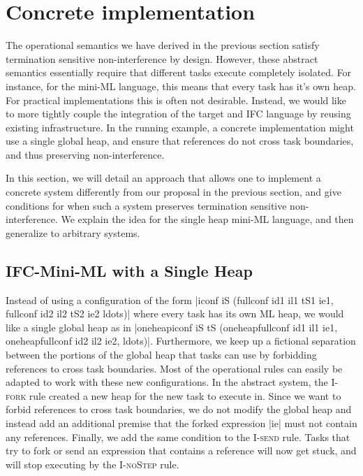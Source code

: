 \section{Concrete implementation}
\label{sec:concrete}


The operational semantics we have derived in the previous section
satisfy termination sensitive non-interference by design.  However,
these abstract semantics essentially require that different tasks
execute completely isolated.  For instance, for the mini-ML language,
this means that every task has it's own heap.  For practical
implementations this is often not desirable.  Instead, we would like to
more tightly couple the integration of the target and IFC
language by reusing existing infrastructure.  In the running example,
a concrete implementation might use a single global heap, and ensure
that references do not cross task boundaries, and thus preserving
non-interference.

In this section, we will detail an approach that allows one to implement
a concrete system differently from our proposal in the previous
section, and give conditions for when such a system preserves termination
sensitive non-interference.
We explain the idea for the single heap mini-ML language, and then
generalize to arbitrary systems.

\subsection{IFC-Mini-ML with a Single Heap}

Instead of using a configuration of the form
|iconf iS (fullconf id1 il1 tS1 ie1, fullconf id2 il2 tS2 ie2 ldots)|
where every task has its
own ML heap, we would like a single global heap as in
|oneheapiconf iS tS (oneheapfullconf id1 il1 ie1, oneheapfullconf id2 il2 ie2, ldots)|.
Furthermore, we keep up a fictional separation between the portions
of the global heap that tasks can use by forbidding references to
cross task boundaries. Most
of the operational rules can easily be adapted to work with these
new configurations.  In the abstract system, the \textsc{I-fork}
rule created a new heap for the new task to execute in.  Since we
want to forbid references to cross task boundaries, we do not modify
the global heap and instead add an additional premise that the forked
expression |ie| must not contain any references.
Finally, we add the same condition to the \textsc{I-send} rule.
Tasks that try to fork or send an expression that contains a
reference will now get stuck, and will stop executing by the
\textsc{I-noStep} rule.

